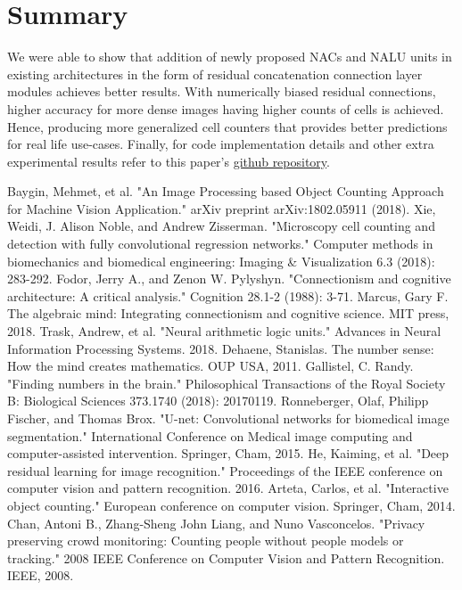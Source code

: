 \documentclass[conference]{IEEEtran}
\begin{document}
\section{Summary}
We were able to show that addition of newly proposed NACs and NALU units in existing architectures in the form of residual concatenation connection layer modules achieves better results. With numerically biased residual connections, higher accuracy for more dense images having higher counts of cells is achieved. Hence, producing more generalized cell counters that provides better predictions for real life use-cases. Finally, for code implementation details and other extra experimental results refer to this paper's  \href{https://github.com/ashishrana160796/nalu-cell-counting}{github repository}.

\begin{thebibliography}{00}
 Baygin, Mehmet, et al. "An Image Processing based Object Counting Approach for Machine Vision Application." arXiv preprint arXiv:1802.05911 (2018).
 Xie, Weidi, J. Alison Noble, and Andrew Zisserman. "Microscopy cell counting and detection with fully convolutional regression networks." Computer methods in biomechanics and biomedical engineering: Imaging \& Visualization 6.3 (2018): 283-292.
Fodor, Jerry A., and Zenon W. Pylyshyn. "Connectionism and cognitive architecture: A critical analysis." Cognition 28.1-2 (1988): 3-71.
Marcus, Gary F. The algebraic mind: Integrating connectionism and cognitive science. MIT press, 2018.
 Trask, Andrew, et al. "Neural arithmetic logic units." Advances in Neural Information Processing Systems. 2018.
  Dehaene, Stanislas. The number sense: How the mind creates mathematics. OUP USA, 2011.
 Gallistel, C. Randy. "Finding numbers in the brain." Philosophical Transactions of the Royal Society B: Biological Sciences 373.1740 (2018): 20170119.
 Ronneberger, Olaf, Philipp Fischer, and Thomas Brox. "U-net: Convolutional networks for biomedical image segmentation." International Conference on Medical image computing and computer-assisted intervention. Springer, Cham, 2015.
 He, Kaiming, et al. "Deep residual learning for image recognition." Proceedings of the IEEE conference on computer vision and pattern recognition. 2016.
 Arteta, Carlos, et al. "Interactive object counting." European conference on computer vision. Springer, Cham, 2014.
 Chan, Antoni B., Zhang-Sheng John Liang, and Nuno Vasconcelos. "Privacy preserving crowd monitoring: Counting people without people models or tracking." 2008 IEEE Conference on Computer Vision and Pattern Recognition. IEEE, 2008.

\end{thebibliography}
\end{document}
